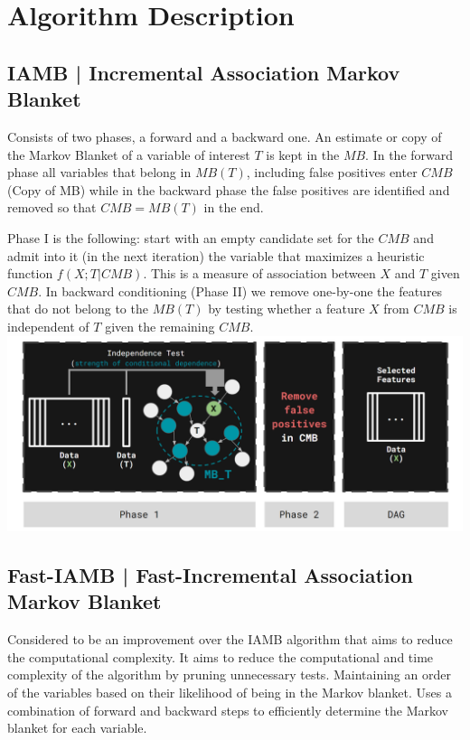 \documentclass{article}
\begin{document}
\section{Algorithm Description}

\subsection{IAMB | Incremental Association Markov Blanket}
Consists of two phases, a forward and a backward one. An estimate or copy of the Markov Blanket of a variable of interest $T$ is kept in the $MB$. 
In the forward phase all variables that belong in $MB(T)$, including false positives enter $CMB$ (Copy of MB) while in the backward phase the false positives are identified and removed so that $CMB = MB(T)$ in the end. 

Phase I is the following: start with an empty candidate set for the $CMB$ and admit into it (in the next iteration) the variable that maximizes a heuristic function  $f(X ; T | CMB)$. This is a measure of association between $X$ and $T$ given $CMB$. 
In backward conditioning (Phase II) we remove one-by-one the features that do not belong to the $MB(T)$ by testing whether a feature $X$ from $CMB$ is independent of $T$ given the remaining $CMB$.
\includegraphics[width=\textwidth,height=\textheight,keepaspectratio]{iamb.png}


\subsection{Fast-IAMB | Fast-Incremental Association Markov Blanket}
Considered to be an improvement over the IAMB algorithm that aims to reduce the computational complexity.
It aims to reduce the computational and time complexity of the algorithm by pruning unnecessary tests.
Maintaining an order of the variables based on their likelihood of being in the Markov blanket.
Uses a combination of forward and backward steps to efficiently determine the Markov blanket for each variable.
\end{document}

